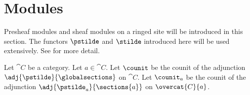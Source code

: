 \section{Modules}
Presheaf modules and sheaf modules on a ringed site will be introduced in this section.
The functors $\pstilde$ and $\stilde$ introduced here will be used extensively.
See \cite[Tag 03A4]{stacks} for more detail.







Let $\cat{C}$ be a category.
Let $a\in \cat{C}$.
Let $\counit$ be the counit of the adjunction $\adj{\pstilde}{\globalsections}$ on $\cat{C}$.
Let $\counit_a$ be the counit of the adjunction $\adj{\pstilde_a}{\sections{a}}$ on $\overcat{C}{a}$.




